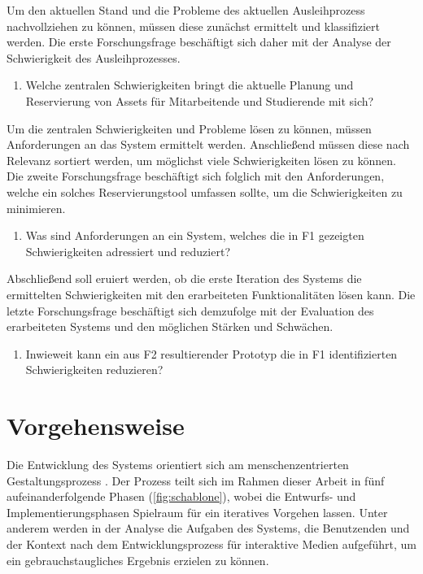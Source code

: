Um den aktuellen Stand und die Probleme des aktuellen Ausleihprozess nachvollziehen zu können,
müssen diese zunächst ermittelt und klassifiziert werden. Die erste Forschungsfrage beschäftigt sich
daher mit der Analyse der Schwierigkeit des Ausleihprozesses.
\begin{enumerate}
  \item[\sffamily\color{maincolor} {F1 |}] {Welche zentralen Schwierigkeiten bringt die aktuelle Planung und Reservierung von Assets für Mitarbeitende und Studierende mit sich?}
\end{enumerate}

Um die zentralen Schwierigkeiten und Probleme lösen zu können, müssen Anforderungen an das System
ermittelt werden. Anschließend müssen diese nach Relevanz sortiert werden, um möglichst viele
Schwierigkeiten lösen zu können. Die zweite Forschungsfrage beschäftigt sich folglich mit den
Anforderungen, welche ein solches Reservierungstool umfassen sollte, um die Schwierigkeiten zu minimieren.

\begin{enumerate}
  \item[\sffamily\color{maincolor} {F2 |}] {Was sind Anforderungen an ein System, welches die in F1 gezeigten Schwierigkeiten adressiert und reduziert?}
\end{enumerate}

Abschließend soll eruiert werden, ob die erste Iteration des Systems die ermittelten Schwierigkeiten
mit den erarbeiteten Funktionalitäten lösen kann. Die letzte Forschungsfrage beschäftigt sich
demzufolge mit der Evaluation des erarbeiteten Systems und den möglichen Stärken und Schwächen.

\begin{enumerate}
  \item[\sffamily\color{maincolor} {F3 |}] {Inwieweit kann ein aus F2 resultierender Prototyp die in F1 identifizierten Schwierigkeiten reduzieren?}
\end{enumerate}

\section{Vorgehensweise}
Die Entwicklung des Systems orientiert sich am menschenzentrierten Gestaltungsprozess
\cite{DINISO9241}. Der Prozess teilt sich im Rahmen dieser Arbeit in
fünf aufeinanderfolgende Phasen (\ref{fig:schablone}), wobei die Entwurfs- und Implementierungsphasen
Spielraum für ein iteratives Vorgehen lassen. Unter anderem werden in der Analyse die Aufgaben des
Systems, die Benutzenden und der Kontext nach dem Entwicklungsprozess für interaktive Medien
\cite{HerczegMDI2009} aufgeführt, um ein gebrauchstaugliches Ergebnis erzielen zu können.

